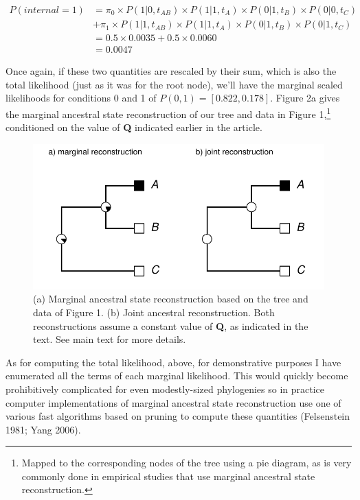 \documentclass{article}
\begin{document}
\[\begin{aligned}
P(internal=1) & = \pi_{0} \times P(1|0,t_{AB}) \times P(1|1,t_{A}) \times P(0|1,t_{B}) \times P(0|0,t_{C})\\
            & + \pi_{1} \times P(1|1,t_{AB}) \times P(1|1,t_{A}) \times P(0|1,t_{B}) \times P(0|1,t_{C})\\
            & =  0.5 \times 0.0035 + 0.5 \times 0.0060 \\
            & = 0.0047
\end{aligned}\]

Once again, if these two quantities are rescaled by their sum, which is also the total likelihood (just as it was for the root node), we'll have the marginal scaled likelihoods for conditions 0 and 1 of \(P(0,1) = [0.822, 0.178]\). Figure 2a gives the marginal ancestral state reconstruction of our tree and data in Figure 1,\footnote{Mapped to the corresponding nodes of the tree using a pie diagram, as is very commonly done in empirical studies that use marginal ancestral state reconstruction.} conditioned on the value of \textbf{Q} indicated earlier in the article.

\begin{figure}
\centering
\includegraphics{Revell.AncestralReconstruction_files/figure-latex/fig2-1.pdf}
\caption{\label{fig:fig2}(a) Marginal ancestral state reconstruction based on the tree and data of Figure 1. (b) Joint ancestral reconstruction. Both reconstructions assume a constant value of \textbf{Q}, as indicated in the text. See main text for more details.}
\end{figure}

As for computing the total likelihood, above, for demonstrative purposes I have enumerated all the terms of each marginal likelihood. This would quickly become prohibitively complicated for even modestly-sized phylogenies so in practice computer implementations of marginal ancestral state reconstruction use one of various fast algorithms based on pruning to compute these quantities (Felsenstein 1981; Yang 2006).
\end{document}
